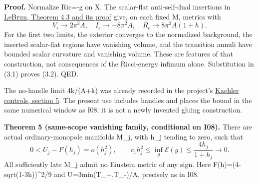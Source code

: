 \documentclass[
  10pt,
]{article}
\begin{document}
\textbf{Proof.} Normalize Ric=-g on X. The scalar-flat anti-self-dual
insertions in \href{https://arxiv.org/html/math/0003068}{LeBrun, Theorem
4.3 and its proof} give, on each fixed M, metrics with \[
 V_\epsilon\to2\pi^2A,\quad I_\epsilon\to-8\pi^2A,
 \quad R_\epsilon\to8\pi^2A(1+h).                        \tag{3.3}
\] For the first two limits, the exterior converges to the normalized
background, the inserted scalar-flat regions have vanishing volume, and
the transition annuli have bounded scalar curvature and vanishing
volume. These are features of that construction, not consequences of the
Ricci-energy infimum alone. Substitution in (3.1) proves (3.2). QED.

The no-handle limit 4k/(A+k) was already recorded in the project's
\href{../mathematics/current/line1_kahler_energy.md}{Kaehler controls,
section 5}. The present use includes handles and places the bound in the
same numerical window as I08; it is not a newly invented gluing
construction.

\textbf{Theorem 5 (same-scope vanishing family, conditional on I08).}
There are actual ordinary-monopole manifolds M\_j, with h\_j tending to
zero, such that \[
 0<U_j-F(h_j)=o(h_j^2),\qquad
 c_1h_j^2\le\inf_g\mathcal E(g)\le\frac{4h_j}{1+h_j}\to0.  \tag{3.4}
\] All sufficiently late M\_j admit no Einstein metric of any sign. Here
F(h)=(4-sqrt(1-3h))\^{}2/9 and U=3min(T\_+,T\_-)/A, precisely as in I08.
\end{document}
